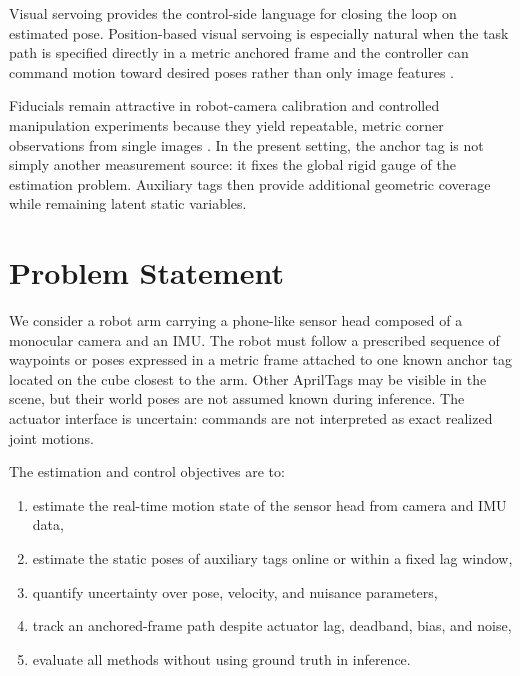 \documentclass[11pt]{article}
\begin{document}
Visual servoing provides the control-side language for closing the loop on estimated pose. Position-based visual servoing is especially natural when the task path is specified directly in a metric anchored frame and the controller can command motion toward desired poses rather than only image features \citep{chaumette2006part1, chaumette2007part2}.

Fiducials remain attractive in robot-camera calibration and controlled manipulation experiments because they yield repeatable, metric corner observations from single images \citep{olson2011apriltag, wang2016apriltag2}. In the present setting, the anchor tag is not simply another measurement source: it fixes the global rigid gauge of the estimation problem. Auxiliary tags then provide additional geometric coverage while remaining latent static variables.

\section{Problem Statement}
We consider a robot arm carrying a phone-like sensor head composed of a monocular camera and an IMU. The robot must follow a prescribed sequence of waypoints or poses expressed in a metric frame attached to one known anchor tag located on the cube closest to the arm. Other AprilTags may be visible in the scene, but their world poses are not assumed known during inference. The actuator interface is uncertain: commands are not interpreted as exact realized joint motions.

The estimation and control objectives are to:
\begin{enumerate}[leftmargin=1.5em]
    \item estimate the real-time motion state of the sensor head from camera and IMU data,
    \item estimate the static poses of auxiliary tags online or within a fixed lag window,
    \item quantify uncertainty over pose, velocity, and nuisance parameters,
    \item track an anchored-frame path despite actuator lag, deadband, bias, and noise,
    \item evaluate all methods without using ground truth in inference.
\end{enumerate}
\end{document}
